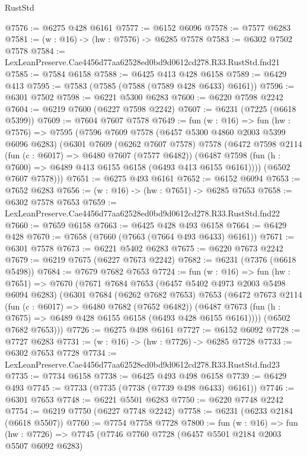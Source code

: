 \begin{lexlean}{RustStd}
\begin{coremodule}
@7576 := @6275 @428 @6161
@7577 := @6152 @6096
@7578 := @7577 @6283
@7581 := (w : @16) -> (hw : @7576) -> @6285 @7578
@7583 := @6302 @7502 @7578
@7584 := LexLeanPreserve.Cae4456d77aa62528ed0bd9d0612cd278.R33.RustStd.fnd21
@7585 := @7584 @6158
@7588 := @6425 @413 @428 @6158
@7589 := @6429 @413
@7595 := @7583 (@7585 (@7588 (@7589 @428 @6433) @6161))
@7596 := @6301 @7502
@7598 := @6221 @5300 @6283
@7600 := @6220 @7598 @2242
@7604 := @6219 @7600 (@6227 @7598 @2242)
@7607 := @6231 (@7225 (@6618 @5399))
@7609 := @7604 @7607 @7578
@7649 := fun (w : @16) =>
  fun (hw : @7576) =>
  @7595
    (@7596
      @7609
      @7578
      (@6457 @5300 @4860 @2003 @5399 @6096 @6283)
      (@6301
        @7609
        (@6262 @7607 @7578)
        @7578
        (@6472
          @7598
          @2114
          (fun (c : @6017) => @6480 @7607 (@7577 @6482))
          (@6487 @7598 (fun (h : @7600) => @6489 @413 @6155 @6158 (@6493 @413 @6155 @6161))))
        (@6502 @7607 @7578)))
@7651 := @6275 @493 @6161
@7652 := @6152 @6094
@7653 := @7652 @6283
@7656 := (w : @16) -> (hw : @7651) -> @6285 @7653
@7658 := @6302 @7578 @7653
@7659 := LexLeanPreserve.Cae4456d77aa62528ed0bd9d0612cd278.R33.RustStd.fnd22
@7660 := @7659 @6158
@7663 := @6425 @428 @493 @6158
@7664 := @6429 @428
@7670 := @7658 (@7660 (@7663 (@7664 @493 @6433) @6161))
@7671 := @6301 @7578
@7673 := @6221 @5402 @6283
@7675 := @6220 @7673 @2242
@7679 := @6219 @7675 (@6227 @7673 @2242)
@7682 := @6231 (@7376 (@6618 @5498))
@7684 := @7679 @7682 @7653
@7724 := fun (w : @16) =>
  fun (hw : @7651) =>
  @7670
    (@7671
      @7684
      @7653
      (@6457 @5402 @4973 @2003 @5498 @6094 @6283)
      (@6301
        @7684
        (@6262 @7682 @7653)
        @7653
        (@6472
          @7673
          @2114
          (fun (c : @6017) => @6480 @7682 (@7652 @6482))
          (@6487 @7673 (fun (h : @7675) => @6489 @428 @6155 @6158 (@6493 @428 @6155 @6161))))
        (@6502 @7682 @7653)))
@7726 := @6275 @498 @6161
@7727 := @6152 @6092
@7728 := @7727 @6283
@7731 := (w : @16) -> (hw : @7726) -> @6285 @7728
@7733 := @6302 @7653 @7728
@7734 := LexLeanPreserve.Cae4456d77aa62528ed0bd9d0612cd278.R33.RustStd.fnd23
@7735 := @7734 @6158
@7738 := @6425 @493 @498 @6158
@7739 := @6429 @493
@7745 := @7733 (@7735 (@7738 (@7739 @498 @6433) @6161))
@7746 := @6301 @7653
@7748 := @6221 @5501 @6283
@7750 := @6220 @7748 @2242
@7754 := @6219 @7750 (@6227 @7748 @2242)
@7758 := @6231 (@6233 @2184 (@6618 @5507))
@7760 := @7754 @7758 @7728
@7800 := fun (w : @16) =>
  fun (hw : @7726) =>
  @7745
    (@7746
      @7760
      @7728
      (@6457 @5501 @2184 @2003 @5507 @6092 @6283)

\end{coremodule}
\end{lexlean}
